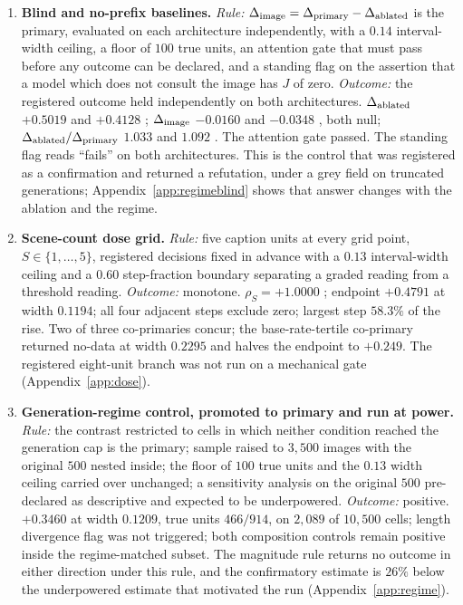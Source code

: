 \begin{enumerate}
\itemsep0.35em

\item \textbf{Blind and no-prefix baselines.}
\emph{Rule:} $\Delta_{\mathrm{image}} = \Delta_{\mathrm{primary}} - \Delta_{\mathrm{ablated}}$ is the primary, evaluated on each architecture
independently, with a $0.14$ interval-width ceiling, a floor of $100$ true units, an attention gate
that must pass before any outcome can be declared, and a standing flag on the
assertion that a model which does not consult the image has $J$ of zero.
\emph{Outcome:} the registered outcome held independently on both architectures. $\Delta_{\mathrm{ablated}}$ $+0.5019$
 and $+0.4128$ ; $\Delta_{\mathrm{image}}$ $-0.0160$
 and $-0.0348$ , both null; $\Delta_{\mathrm{ablated}}/\Delta_{\mathrm{primary}}$ $1.033$
 and $1.092$ . The attention gate passed. The standing flag reads
``fails'' on both architectures. This is the control that was registered as a confirmation and
returned a refutation, under a grey field on truncated generations; Appendix~\ref{app:regimeblind}
shows that answer changes with the ablation and the regime.

\item \textbf{Scene-count dose grid.}
\emph{Rule:} five caption units at every grid point, $S \in \{1,\dots,5\}$, registered decisions fixed in
advance with a $0.13$ interval-width ceiling and a $0.60$ step-fraction boundary separating a graded
reading from a threshold reading.
\emph{Outcome:} monotone. $\rho_S = +1.0000$ ; endpoint $+0.4791$
 at width $0.1194$; all four adjacent steps exclude zero; largest step $58.3\%$
of the rise. Two of three co-primaries concur; the base-rate-tertile co-primary returned no-data at
width $0.2295$ and halves the endpoint to $+0.249$. The registered eight-unit branch was not run on a
mechanical gate (Appendix~\ref{app:dose}).

\item \textbf{Generation-regime control, promoted to primary and run at power.}
\emph{Rule:} the contrast restricted to cells in which neither condition reached the generation cap
is the primary; sample raised to $3{,}500$ images with the original $500$ nested inside; the floor of
$100$ true units and the $0.13$ width ceiling carried over unchanged; a sensitivity analysis on the
original $500$ pre-declared as descriptive and expected to be underpowered.
\emph{Outcome:} positive. $+0.3460$  at width $0.1209$, true units $466/914$,
on $2{,}089$ of $10{,}500$ cells; length divergence flag was not triggered; both composition controls
remain positive inside the regime-matched subset. The magnitude rule returns no outcome in either direction
under this rule, and the confirmatory estimate is $26\%$ below the underpowered estimate that motivated the
run (Appendix~\ref{app:regime}).


\end{enumerate}
